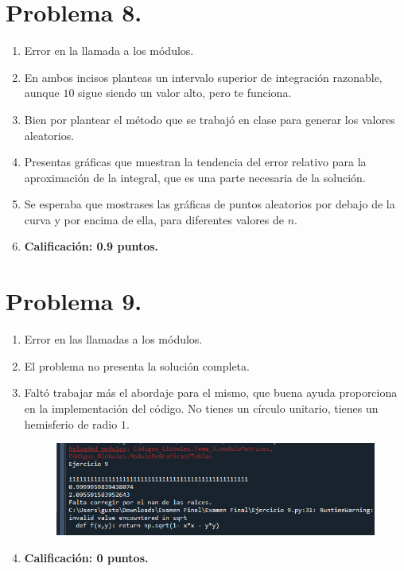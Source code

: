 \section{Problema 8.}

\begin{enumerate}
\item Error en la llamada a los módulos.
\item En ambos incisos planteas un intervalo superior de integración razonable, aunque $10$ sigue siendo un valor alto, pero te funciona.
\item Bien por plantear el método que se trabajó en clase para generar los valores aleatorios.
\item Presentas gráficas que muestran la tendencia del error relativo para la aproximación de la integral, que es una parte necesaria de la solución.
\item Se esperaba que mostrases las gráficas de puntos aleatorios por debajo de la curva y por encima de ella, para diferentes valores de $n$.
\item \textbf{Calificación: 0.9 puntos.}
\end{enumerate}

\section{Problema 9.}

\begin{enumerate}
\item Error en las llamadas a los módulos.
\item El problema no presenta la solución completa.
\item Faltó trabajar más el abordaje para el mismo, que buena ayuda proporciona en la implementación del código. No tienes un círculo unitario, tienes un hemisferio de radio $1$.
\begin{figure}
    \centering
    \includegraphics[scale=0.8]{Evidencia_Antonio_09.png}
\end{figure}
\item \textbf{Calificación: 0 puntos.}
\end{enumerate}





